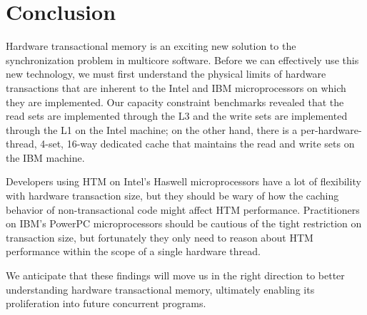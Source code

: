 \section{Conclusion}
Hardware transactional memory is an exciting new solution to the synchronization
problem in multicore software. Before we can effectively use this new
technology, we must first understand the physical limits of hardware
transactions that are inherent to the Intel and IBM microprocessors on which
they are implemented. Our capacity constraint benchmarks revealed that the read
sets are implemented through the {L3} and the write sets are implemented through
the {L1} on the Intel machine; on the other hand, there is a
per-hardware-thread, 4-set, 16-way dedicated cache that maintains the read and
write sets on the IBM machine.

Developers using HTM on Intel's Haswell microprocessors have a lot of
flexibility with hardware transaction size, but they should be wary of how the
caching behavior of non-transactional code might affect HTM performance.
Practitioners on IBM's PowerPC microprocessors should be cautious of the tight
restriction on transaction size, but fortunately they only need to reason about
HTM performance within the scope of a single hardware thread.

We anticipate that these findings will move us in the right direction to better
understanding hardware transactional memory, ultimately enabling its
proliferation into future concurrent programs.
 
